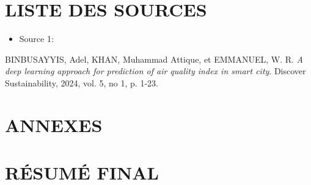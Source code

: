\documentclass[12pt,a4paper]{report}
\begin{document}
\newpage
{}
{}
\chapter*{LISTE DES SOURCES}
\begin{itemize}
    \item Source 1: \cite{source1}
\end{itemize}

\newpage
{}
{}
\printindex

\newpage
{}
{}
\begin{thebibliography}{99}
 BINBUSAYYIS, Adel, KHAN, Muhammad Attique, et EMMANUEL, W. R. \textit{A deep learning approach for prediction of air quality index in smart city}. Discover Sustainability, 2024, vol. 5, no 1, p. 1-23.
\end{thebibliography}

\appendix
\chapter*{ANNEXES}
\lipsum[8]

\newpage
\thispagestyle{empty}
\mbox{}

\newpage
{}
{}
\chapter*{RÉSUMÉ FINAL}
\lipsum[11]
\end{document}
